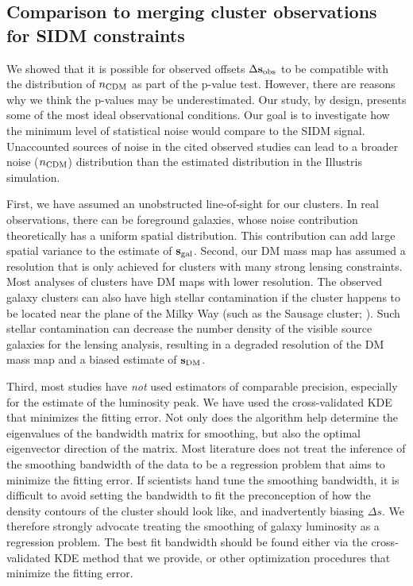   
\subsection{Comparison to merging cluster observations for SIDM constraints 
}
\label{subsec:limitation_of_pvalue}
We showed that it is possible for observed offsets $\Delta {\bf s}_{\rm obs}$ to be 
compatible with the distribution of $n_{\rm CDM}$ as part of the p-value test. 
However, there are reasons why we think the p-values may be underestimated.
Our study, by design, presents some of the most ideal observational conditions. 
Our goal is to investigate how the minimum level of statistical noise would 
compare to the SIDM signal.
Unaccounted sources of noise in the cited observed studies  
can lead to a broader noise ($n_{\rm CDM}$) distribution than the estimated distribution in the
Illustris simulation. 

First, we have assumed an unobstructed line-of-sight for our clusters. 
In real observations, there can be foreground galaxies, whose noise contribution
theoretically has a uniform spatial distribution. 
This contribution can add large spatial variance to the estimate of ${\bf
s}_{\rm gal}$. 
Second, our DM mass map has assumed a resolution that is only achieved for clusters 
with many strong lensing constraints. 
Most analyses of clusters have DM maps with lower resolution. 
The observed galaxy clusters can also have high stellar contamination
if the cluster happens to be located near the plane of the Milky Way 
(such as the Sausage cluster; \citealt{Jee2015}). 
Such stellar contamination can decrease the number density of the visible source galaxies for the
lensing analysis, resulting in a degraded resolution of the DM mass map and a
biased estimate of ${\bf s}_{\rm DM}$. 
  
Third, most studies have {\it not} used estimators of comparable precision, especially for
the estimate of the luminosity peak. We have used the cross-validated KDE that
minimizes the fitting error. Not only does the algorithm help
determine the eigenvalues of the bandwidth matrix for smoothing, 
but also the optimal eigenvector direction of the matrix. 
Most literature does not treat the inference of the smoothing bandwidth 
of the data to be a regression problem that aims to minimize the fitting error.  
If scientists hand tune the smoothing bandwidth, it is difficult to
avoid setting the bandwidth to fit the preconception of how the density
contours of the cluster 
should look like, and inadvertently biasing $\Delta s$. We therefore strongly
advocate treating the smoothing of galaxy luminosity as a regression problem.
The best fit bandwidth should be found either via 
the cross-validated KDE method that we provide, or other optimization  
procedures that minimize the fitting error.


